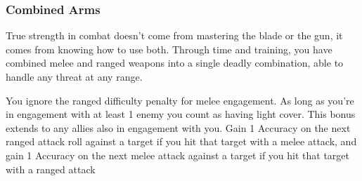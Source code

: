\subsubsection{Combined Arms}

\begin{talent}
{True strength in combat doesn’t come from mastering the blade or the gun, it comes from knowing how to use both. Through time and training, you have combined melee and ranged weapons into a single deadly combination, able to handle any threat at any range.}

You ignore the ranged difficulty penalty for melee engagement. 
As long as you’re in engagement with at least 1 enemy you count as having light cover. This bonus extends to any allies also in engagement with you. 
Gain 1 Accuracy on the next ranged attack roll against a target if you hit that target with a melee attack, and gain 1 Accuracy on the next melee attack against a target if you hit that target with a ranged attack
\end{talent}